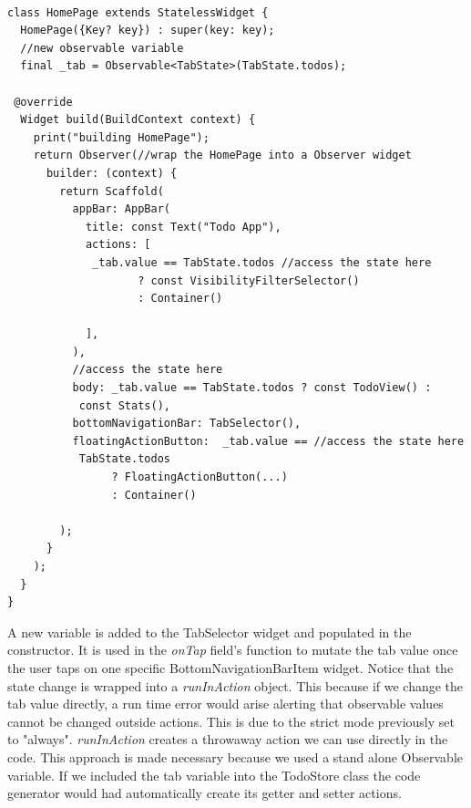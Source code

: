 \begin{code}
\mbox{}\\
 \mbox{}
		\label{code:2.14}
\begin{verbatim}
class HomePage extends StatelessWidget {
  HomePage({Key? key}) : super(key: key); 
  //new observable variable
  final _tab = Observable<TabState>(TabState.todos);

 @override
  Widget build(BuildContext context) {
    print("building HomePage");
    return Observer(//wrap the HomePage into a Observer widget
      builder: (context) {
        return Scaffold(
          appBar: AppBar(
            title: const Text("Todo App"),
            actions: [
             _tab.value == TabState.todos //access the state here
                    ? const VisibilityFilterSelector()
                    : Container()

            ],
          ),
          //access the state here
          body: _tab.value == TabState.todos ? const TodoView() :
           const Stats(),
          bottomNavigationBar: TabSelector(),
          floatingActionButton:  _tab.value == //access the state here
           TabState.todos
                ? FloatingActionButton(...)
                : Container()

        );
      }
    );
  }
}
\end{verbatim}
\mbox{}
\end{code}

A new variable is added to the TabSelector widget and populated in the constructor. It is used in the \textit{onTap} field’s function to mutate the tab value once the user taps on one specific BottomNavigationBarItem widget. Notice that the state change is wrapped into a \textit{runInAction} object. This because if we change the tab value directly, a run time error would arise alerting that observable values cannot be changed outside actions. This is due to the strict mode previously set to "always". \textit{runInAction} creates a throwaway action we can use directly in the code. This approach is made necessary because we used a stand alone Observable variable. If we included the tab variable into the TodoStore class the code generator would had automatically create its getter and setter actions.


